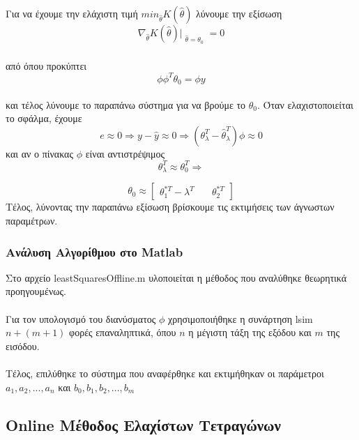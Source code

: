 \documentclass[12pt]{article}
\begin{document}
Για να έχουμε την ελάχιστη τιμή \quad $min_{\hat{\theta}} K(\hat{\theta})$ λύνουμε την εξίσωση
\\ 
\[  \nabla_{\hat{\theta}} K(\hat{\theta}) \Bigr|_{\substack{\hat{\theta} =\theta_{0}}}=0 \]
 \\
 από όπου προκύπτει 
 \[
 \phi\phi^{T}\theta_{0}=\phi y
\] 
 \\ 
και τέλος λύνουμε το παραπάνω σύστημα για να βρούμε το $\theta_{0}$. Όταν ελαχιστοποιείται το σφάλμα, έχουμε
 \\
\[ e \approx 0 \Rightarrow y-\hat{y} \approx 0 \Rightarrow (\theta^{T}_{\lambda}-\hat{\theta}^{T}_{\lambda})\phi \approx 0\] 
και αν ο πίνακας $\phi$ είναι αντιστρέψιμος
\[\theta^{T}_{\lambda} \approx \theta_{0}^{T} \Rightarrow\]
 
 \[ \theta_{0} \approx
\begin{bmatrix}
		\theta_{1}^{*T}-\lambda^{Τ} \quad& \theta_{2}^{*T}
\end{bmatrix}\]
 Τέλος, λύνοντας την παραπάνω εξίσωση βρίσκουμε τις εκτιμήσεις των άγνωστων παραμέτρων.
\subsubsection{Ανάλυση Αλγορίθμου στο Matlab}
Στο αρχείο leastSquaresOffline.m υλοποιείται η μέθοδος που αναλύθηκε θεωρητικά προηγουμένως.
\\ \\
Για τον υπολογισμό του διανύσματος $\phi$ χρησιμοποιήθηκε η συνάρτηση lsim $n+(m+1)$ φορές επαναληπτικά, όπου $n$ η μέγιστη τάξη της εξόδου και $m$ της εισόδου.
\\ \\
Τέλος, επιλύθηκε το σύστημα που αναφέρθηκε και εκτιμήθηκαν οι παράμετροι $a_1, a_2, ... , a_n $ και $b_0 , b_1, b_2, ... , b_m $
\subsection{Online Μέθοδος Ελαχίστων Τετραγώνων}
\end{document}

